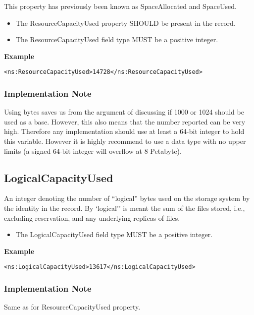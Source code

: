 This property has previously been known as SpaceAllocated and SpaceUsed.

\begin{itemize}
\item The ResourceCapacityUsed property SHOULD be present in the record.
\item The ResourceCapacityUsed field type MUST be a positive integer.
\end{itemize}

{\bf Example}
\begin{verbatim}
<ns:ResourceCapacityUsed>14728</ns:ResourceCapacityUsed>
\end{verbatim}

\subsubsection*{Implementation Note}

Using bytes saves us from the argument of discussing if 1000 or 1024 should be
used as a base. However, this also means that the number reported can be very
high. Therefore any implementation should use at least a 64-bit integer to hold
this variable. However it is highly recommend to use a data type with no upper
limits (a signed 64-bit integer will overflow at 8 Petabyte).


\subsection{LogicalCapacityUsed}

An integer denoting the number of ``logical'' bytes used on the storage system
by the identity in the record. By `logical'' is meant the sum of the files
stored, i.e., excluding reservation, and any underlying replicas of files.

\begin{itemize}
\item The LogicalCapacityUsed field type MUST be a positive integer.
\end{itemize}

{\bf Example}
\begin{verbatim}
<ns:LogicalCapacityUsed>13617</ns:LogicalCapacityUsed>
\end{verbatim}

\subsubsection*{Implementation Note}

Same as for ResourceCapacityUsed property.


